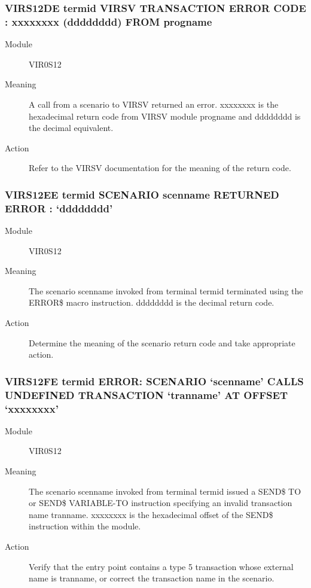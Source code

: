\documentclass[letterpaper,10pt,english]{sphinxmanual}
\begin{document}
\subsubsection{VIRS12DE termid VIRSV TRANSACTION ERROR CODE : xxxxxxxx (dddddddd) FROM progname}
\label{\detokenize{messages:virs12de-termid-virsv-transaction-error-code-xxxxxxxx-dddddddd-from-progname}}\begin{description}
\item[{Module}] \leavevmode
VIR0S12

\item[{Meaning}] \leavevmode
A call from a scenario to VIRSV returned an error. xxxxxxxx is the hexadecimal return code from VIRSV module progname and dddddddd is the decimal equivalent.

\item[{Action}] \leavevmode
Refer to the VIRSV documentation for the meaning of the return code.

\end{description}


\subsubsection{VIRS12EE termid SCENARIO scenname RETURNED ERROR : ‘dddddddd’}
\label{\detokenize{messages:virs12ee-termid-scenario-scenname-returned-error-dddddddd}}\begin{description}
\item[{Module}] \leavevmode
VIR0S12

\item[{Meaning}] \leavevmode
The scenario scenname invoked from terminal termid terminated using the ERROR\$ macro instruction. dddddddd is the decimal return code.

\item[{Action}] \leavevmode
Determine the meaning of the scenario return code and take appropriate action.

\end{description}


\subsubsection{VIRS12FE termid ERROR: SCENARIO ‘scenname’ CALLS UNDEFINED TRANSACTION ‘tranname’ AT OFFSET ‘xxxxxxxx’}
\label{\detokenize{messages:virs12fe-termid-error-scenario-scenname-calls-undefined-transaction-tranname-at-offset-xxxxxxxx}}\begin{description}
\item[{Module}] \leavevmode
VIR0S12

\item[{Meaning}] \leavevmode
The scenario scenname invoked from terminal termid issued a SEND\$ TO or SEND\$ VARIABLE-TO instruction specifying an invalid transaction name tranname. xxxxxxxx is the hexadecimal offset of the SEND\$ instruction within the module.

\item[{Action}] \leavevmode
Verify that the entry point contains a type 5 transaction whose external name is tranname, or correct the transaction name in the scenario.

\end{description}
\end{document}
